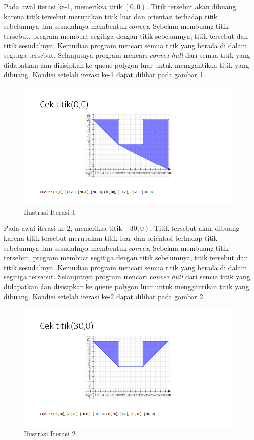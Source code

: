 \par Pada awal iterasi ke-1, memeriksa titik $(0,0)$. Titik tersebut akan dibuang karena titik tersebut merupakan titik luar dan orientasi terhadap titik sebelumnya dan sesudahnya membentuk \textit{convex}. Sebelum membuang titik tersebut, program membuat segitiga dengan titik sebelumnya, titik tersebut dan titik sesudahnya. Kemudian program mencari semua titik yang berada di dalam segitiga tersebut. Selanjutnya program mencari \textit{convex hull} dari semua titik yang didapatkan dan disisipkan ke queue polygon luar untuk menggantikan titik yang dibuang. Kondisi setelah iterasi ke-1 dapat dilihat pada gambar \ref{fig:iterasi-1}.
\begin{figure}[!h]
	\Centering
	\includegraphics [width=\columnwidth]{bab5/img/iterasi-1}
	\caption {Ilustrasi Iterasi 1}
	\label {fig:iterasi-1}
\end{figure}

\par Pada awal iterasi ke-2, memeriksa titik $(30,0)$. Titik tersebut akan dibuang karena titik tersebut merupakan titik luar dan orientasi terhadap titik sebelumnya dan sesudahnya membentuk \textit{convex}. Sebelum membuang titik tersebut, program membuat segitiga dengan titik sebelumnya, titik tersebut dan titik sesudahnya. Kemudian program mencari semua titik yang berada di dalam segitiga tersebut. Selanjutnya program mencari \textit{convex hull} dari semua titik yang didapatkan dan disisipkan ke queue polygon luar untuk menggantikan titik yang dibuang. Kondisi setelah iterasi ke-2 dapat dilihat pada gambar \ref{fig:iterasi-2}.
\begin{figure}[!h]
	\Centering
	\includegraphics [width=\columnwidth]{bab5/img/iterasi-2}
	\caption {Ilustrasi Iterasi 2}
	\label {fig:iterasi-2}
\end{figure}


